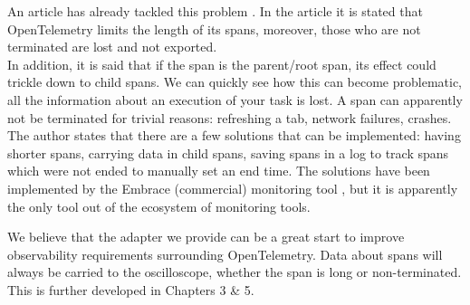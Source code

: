         An article has already tackled this problem \cite{otel-l}. In the article it is stated that OpenTelemetry limits the length of its spans, moreover, those who are not terminated are lost and not exported. \\ 
        In addition, it is said that if the span is the parent/root span, its effect could trickle down to child spans. We can quickly see how this can become problematic, all the information about an execution of your task is lost. A span can apparently not be terminated for trivial reasons: refreshing a tab, network failures, crashes. The author states that there are a few solutions that can be implemented: having shorter spans, carrying data in child spans, saving spans in a log to track spans which were not ended to manually set an end time. The solutions have been implemented by the Embrace (commercial) monitoring tool \cite{embr}, but it is apparently the only tool out of the ecosystem of monitoring tools.

     We believe that the adapter we provide can be a great start to improve observability requirements surrounding OpenTelemetry. Data about spans will always be carried to the oscilloscope, whether the span is long or non-terminated. This is further developed in Chapters 3 \& 5.
